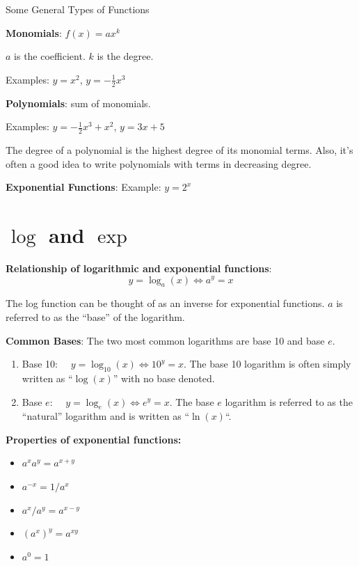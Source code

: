 \documentclass[]{book}
\providecommand{\tightlist}{%
  \setlength{\itemsep}{0pt}\setlength{\parskip}{0pt}}
\theoremstyle{definition}
\theoremstyle{definition}
\theoremstyle{definition}
\theoremstyle{remark}
\begin{document}
Some General Types of Functions

\textbf{Monomials}: \(f(x)=a x^k\)

\(a\) is the coefficient. \(k\) is the degree.

Examples: \(y=x^2\), \(y=-\frac{1}{2}x^3\)

\textbf{Polynomials}: sum of monomials.

Examples: \(y=-\frac{1}{2}x^3+x^2\), \(y=3x+5\)

The degree of a polynomial is the highest degree of its monomial terms.
Also, it's often a good idea to write polynomials with terms in
decreasing degree.

\textbf{Exponential Functions}: Example: \(y=2^x\)

\section{\texorpdfstring{\(\log\) and
\(\exp\)}{\textbackslash{}log and \textbackslash{}exp}}\label{logexponents}

\textbf{Relationship of logarithmic and exponential functions}:
\[y=\log_a(x) \iff a^y=x\]

The log function can be thought of as an inverse for exponential
functions. \(a\) is referred to as the ``base'' of the logarithm.

\textbf{Common Bases}: The two most common logarithms are base 10 and
base \(e\).

\begin{enumerate}
\def\labelenumi{\arabic{enumi}.}
\tightlist
\item
  Base 10: \(\quad y=\log_{10}(x) \iff 10^y=x\). The base 10 logarithm
  is often simply written as ``\(\log(x)\)'' with no base denoted.
\item
  Base \(e\): \(\quad y=\log_e(x) \iff e^y=x\). The base \(e\) logarithm
  is referred to as the ``natural'' logarithm and is written as
  ``\(\ln(x)\)``.
\end{enumerate}

\textbf{Properties of exponential functions:}

\begin{itemize}
\tightlist
\item
  \(a^x a^y = a^{x+y}\)
\item
  \(a^{-x} = 1/a^x\)
\item
  \(a^x/a^y = a^{x-y}\)
\item
  \((a^x)^y = a^{x y}\)
\item
  \(a^0 = 1\)
\end{itemize}
\end{document}

